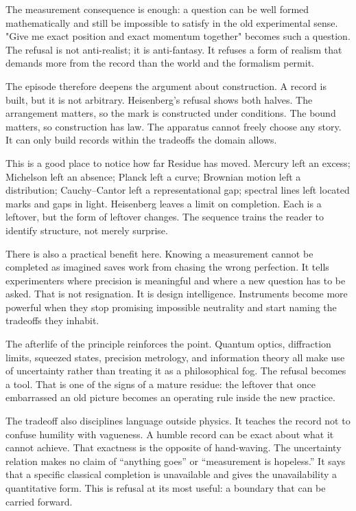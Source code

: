 The measurement consequence is enough: a question can be well formed
mathematically and still be impossible to satisfy in the old experimental
sense. "Give me exact position and exact momentum together" becomes such a
question. The refusal is not anti-realist; it is anti-fantasy. It refuses a
form of realism that demands more from the record than the world and the
formalism permit.

The episode therefore deepens the argument about construction. A record is
built, but it is not arbitrary. Heisenberg's refusal shows both halves. The
arrangement matters, so the mark is constructed under conditions. The bound
matters, so construction has law. The apparatus cannot freely choose any story.
It can only build records within the tradeoffs the domain allows.

This is a good place to notice how far Residue has moved. Mercury left an
excess; Michelson left an absence; Planck left a curve; Brownian motion left
a distribution; Cauchy--Cantor left a representational gap; spectral lines
left located marks and gaps in light. Heisenberg leaves a limit on completion.
Each is a leftover, but the form of leftover changes. The sequence trains the
reader to identify structure, not merely surprise.

There is also a practical benefit here. Knowing a measurement cannot be
completed as imagined saves work from chasing the wrong perfection. It tells
experimenters where precision is meaningful and where a new question has to
be asked. That is not resignation. It is design intelligence. Instruments become
more powerful when they stop promising impossible neutrality and start naming
the tradeoffs they inhabit.

The afterlife of the principle reinforces the point. Quantum optics,
diffraction limits, squeezed states, precision metrology, and information
theory all make use of uncertainty rather than treating it as a philosophical
fog. The refusal becomes a tool. That is one of the signs of a mature residue:
the leftover that once embarrassed an old picture becomes an operating rule
inside the new practice.

The tradeoff also disciplines language outside physics. It teaches the record
not to confuse humility with vagueness. A humble record can be exact about what
it cannot achieve. That exactness is the opposite of hand-waving. The
uncertainty relation makes no claim of ``anything goes'' or ``measurement is
hopeless.'' It says that a specific classical completion is unavailable and gives the
unavailability a quantitative form. This is refusal at its most useful: a
boundary that can be carried forward.

